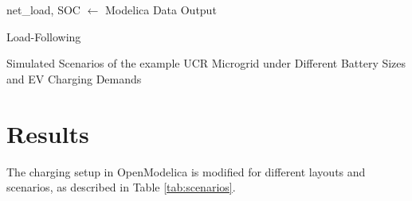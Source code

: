 \documentclass[conference]{IEEEtran}
\begin{document}
		\begin{algorithm}
			net\_load, SOC $\gets$ Modelica Data Output \\
			\caption{Load-Following}
			\label{alg:peakshavingflatrate}
		\end{algorithm}
		\begin{table}
			\caption{Simulated Scenarios of the example UCR Microgrid under Different Battery Sizes and EV Charging Demands}
			
			\normalsize
			\label{tab:scenarios}
		\end{table}
\section{Results}
	The charging setup in OpenModelica is modified for different layouts and scenarios, as described in Table \ref{tab:scenarios}.
	
\end{document}
